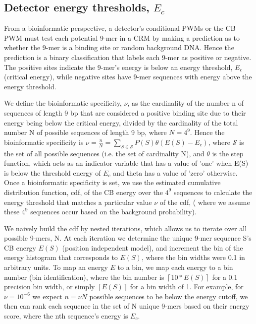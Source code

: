 \subsection{Detector energy thresholds, $E_c$}
From a bioinformatic perspective, a detector's conditional PWMs or the CB PWM must test each potential 9-mer in a CRM by making a prediction as to whether the 9-mer is a binding site or random background DNA.  Hence the prediction is a binary classification that labels each 9-mer as positive or negative.  The positive sites indicate the 9-mer's energy is below an energy threshold, $E_c$ (critical energy), while negative sites have 9-mer sequences with energy above the energy threshold.

We define the bioinformatic specificity, $\nu$, as the cardinality of the number n of sequences of length 9 bp that are considered a positive binding site due to their energy being below the critical energy, divided by the cardinality of the total number N of possible sequences of length 9 bp, where $N=4^9$.  Hence the bioinformatic specificity is $\nu =\frac{n}{N}= \sum_{S\in \mathcal S} P(S) \theta(E(S)-E_c) $, where $\mathcal S$ is the set of all possible sequences (i.e. the set of cardinality N), and $\theta$ is the step function, which acts as an indicator variable that has a value of 'one' when E(S) is below the threshold energy of $E_c$ and theta has a value of 'zero' otherwise.  Once a bioinformatic specificity is set, we use the estimated cumulative distribution function, cdf, of the CB energy over the $4^9$ sequences to calculate the energy threshold that matches a particular value $\nu$ of the cdf, ( where we assume these $4^9$ sequences occur based on the background probability).

We naively build the cdf by nested iterations, which allows us to iterate over all possible 9-mers, N.  At each iteration we determine the unique 9-mer sequence S's CB energy $E(S)$ (position independent model), and increment the bin of the energy histogram that corresponds to $E(S)$, where the bin widths were 0.1 in arbitrary units.  To map an energy $E$ to a bin, we map each energy to a bin number (bin identification), where the bin number is $\left \lceil{10*E(S)}\right \rceil$ for a 0.1 precision bin width, or simply $\left \lceil{E(S)}\right \rceil$ for a bin width of 1.  For example, for $\nu=10^{-6}$ we expect $n=\nu N$ possible sequences to be below the energy cutoff, we then can rank each sequence in the set of N unique 9-mers based on their energy score, where the nth sequence's energy is $E_c$.

